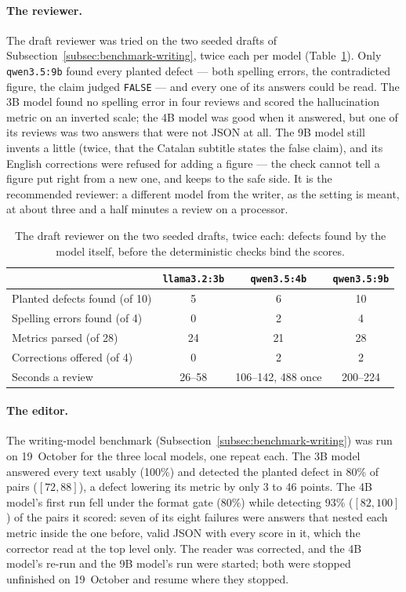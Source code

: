 \paragraph{The reviewer.} The draft reviewer was tried on the two seeded
drafts of Subsection~\ref{subsec:benchmark-writing}, twice each per
model (Table~\ref{tab:reviewer-trial}). Only \texttt{qwen3.5:9b} found
every planted defect --- both spelling errors, the contradicted figure,
the claim judged \texttt{FALSE} --- and every one of its answers could
be read. The 3B model found no spelling error in four reviews and
scored the hallucination metric on an inverted scale; the 4B model was
good when it answered, but one of its reviews was two answers that were
not JSON at all. The 9B model still invents a little (twice, that the
Catalan subtitle states the false claim), and its English corrections
were refused for adding a figure --- the check cannot tell a figure put
right from a new one, and keeps to the safe side. It is the recommended
reviewer: a different model from the writer, as the setting is meant,
at about three and a half minutes a review on a processor.

\begin{table}[ht]
\centering
\small
\begin{tabular}{@{}lccc@{}}
\toprule
& \texttt{llama3.2:3b} & \texttt{qwen3.5:4b} & \texttt{qwen3.5:9b} \\
\midrule
Planted defects found (of 10) & 5 & 6 & 10 \\
Spelling errors found (of 4) & 0 & 2 & 4 \\
Metrics parsed (of 28) & 24 & 21 & 28 \\
Corrections offered (of 4) & 0 & 2 & 2 \\
Seconds a review & 26--58 & 106--142, 488 once & 200--224 \\
\bottomrule
\end{tabular}
\caption[The reviewer trial]{The draft reviewer on the two seeded drafts,
twice each: defects found by the model itself, before the deterministic
checks bind the scores.}
\label{tab:reviewer-trial}
\end{table}

\paragraph{The editor.} The writing-model benchmark
(Subsection~\ref{subsec:benchmark-writing}) was run on 19~October for
the three local models, one repeat each. The 3B model answered every
text usably (100\%) and detected the planted defect in 80\% of pairs
($[72, 88]$), a defect lowering its metric by only 3 to 46 points. The
4B model's first run fell under the format gate (80\%) while detecting
93\% ($[82, 100]$) of the pairs it scored: seven of its eight failures
were answers that nested each metric inside the one before, valid JSON
with every score in it, which the corrector read at the top level only.
The reader was corrected, and the 4B model's re-run and the 9B
model's run were started; both were stopped unfinished on 19~October
and resume where they stopped.
